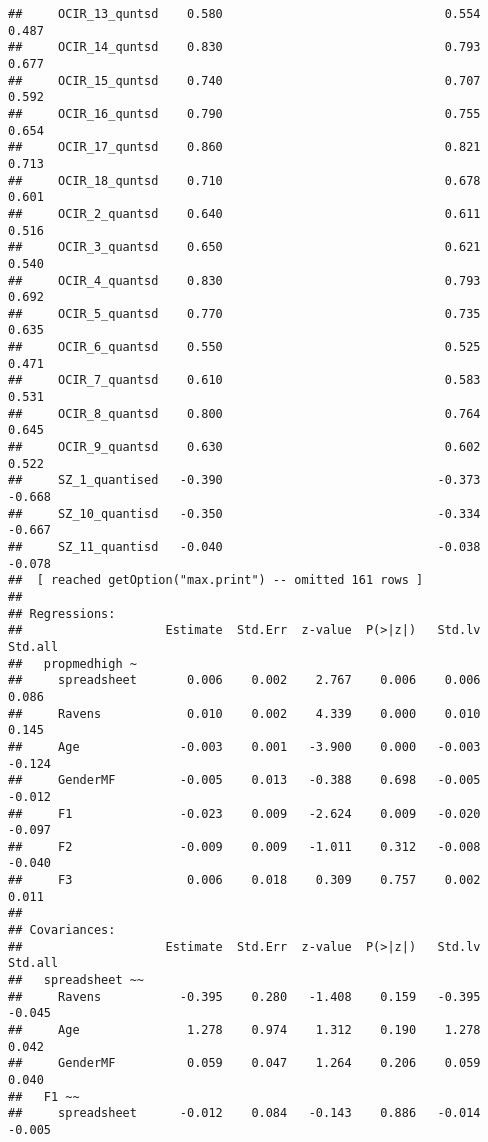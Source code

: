 \documentclass[]{article}
\begin{document}
\begin{verbatim}
##     OCIR_13_quntsd    0.580                               0.554    0.487
##     OCIR_14_quntsd    0.830                               0.793    0.677
##     OCIR_15_quntsd    0.740                               0.707    0.592
##     OCIR_16_quntsd    0.790                               0.755    0.654
##     OCIR_17_quntsd    0.860                               0.821    0.713
##     OCIR_18_quntsd    0.710                               0.678    0.601
##     OCIR_2_quantsd    0.640                               0.611    0.516
##     OCIR_3_quantsd    0.650                               0.621    0.540
##     OCIR_4_quantsd    0.830                               0.793    0.692
##     OCIR_5_quantsd    0.770                               0.735    0.635
##     OCIR_6_quantsd    0.550                               0.525    0.471
##     OCIR_7_quantsd    0.610                               0.583    0.531
##     OCIR_8_quantsd    0.800                               0.764    0.645
##     OCIR_9_quantsd    0.630                               0.602    0.522
##     SZ_1_quantised   -0.390                              -0.373   -0.668
##     SZ_10_quantisd   -0.350                              -0.334   -0.667
##     SZ_11_quantisd   -0.040                              -0.038   -0.078
##  [ reached getOption("max.print") -- omitted 161 rows ]
## 
## Regressions:
##                    Estimate  Std.Err  z-value  P(>|z|)   Std.lv  Std.all
##   propmedhigh ~                                                         
##     spreadsheet       0.006    0.002    2.767    0.006    0.006    0.086
##     Ravens            0.010    0.002    4.339    0.000    0.010    0.145
##     Age              -0.003    0.001   -3.900    0.000   -0.003   -0.124
##     GenderMF         -0.005    0.013   -0.388    0.698   -0.005   -0.012
##     F1               -0.023    0.009   -2.624    0.009   -0.020   -0.097
##     F2               -0.009    0.009   -1.011    0.312   -0.008   -0.040
##     F3                0.006    0.018    0.309    0.757    0.002    0.011
## 
## Covariances:
##                    Estimate  Std.Err  z-value  P(>|z|)   Std.lv  Std.all
##   spreadsheet ~~                                                        
##     Ravens           -0.395    0.280   -1.408    0.159   -0.395   -0.045
##     Age               1.278    0.974    1.312    0.190    1.278    0.042
##     GenderMF          0.059    0.047    1.264    0.206    0.059    0.040
##   F1 ~~                                                                 
##     spreadsheet      -0.012    0.084   -0.143    0.886   -0.014   -0.005

\end{verbatim}
\end{document}
